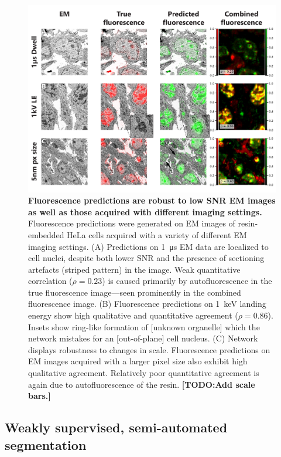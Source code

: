 \begin{figure}[!htb]
    \centering
    \includegraphics[width=\linewidth]{chapter-4/figures/fig4_robustness_v2.pdf}
    \caption{\textbf{Fluorescence predictions are robust to low SNR EM images as well as those acquired with different imaging settings.}
    Fluorescence predictions were generated on EM images of resin-embedded HeLa cells acquired with a variety of different EM imaging settings.
    (A) Predictions on \SI{1}{\micro\second} EM data are localized to cell nuclei, despite both lower SNR and the presence of sectioning artefacts (striped pattern) in the image. Weak quantitative correlation ($\rho=0.23$) is caused primarily by autofluorescence in the true fluorescence image---seen prominently in the combined fluorescence image.
    (B) Fluorescence predictions on \SI{1}{\kilo\electronvolt} landing energy show high qualitative and quantitative agreement ($\rho=0.86$). Insets show ring-like formation of [unknown organelle] which the network mistakes for an [out-of-plane] cell nucleus.
    (C) Network displays robustness to changes in scale. Fluorescence predictions on EM images acquired with a larger pixel size also exhibit high qualitative agreement. Relatively poor quantitative agreement is again due to autofluorescence of the resin.
    \textbf{[TODO:Add scale bars.]}}
    \label{fig:4.4_robustness}
\end{figure}


\clearpage
\subsection{Weakly supervised, semi-automated segmentation}
\label{sec:4results_segmentation}


